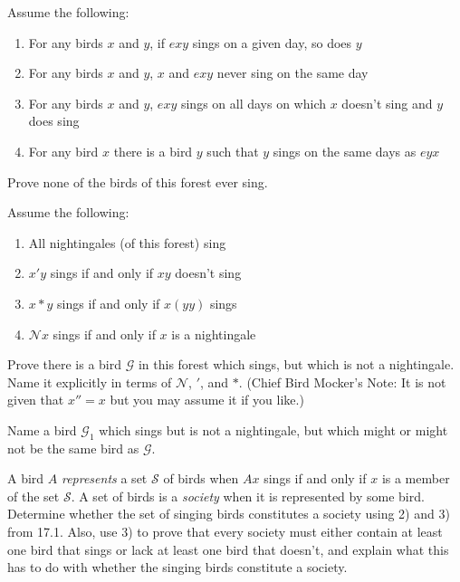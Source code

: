 \documentclass[12pt, letterpaper]{article}
\begin{document}
\begin{prob}{16.1} 
Assume the following:

\begin{enumerate}[label=\textbf{\arabic*)},itemsep=0mm]
  \item For any birds $x$ and $y$, if $exy$ sings on a given day, so does $y$
  \item For any birds $x$ and $y$, $x$ and $exy$ never sing on the same day
  \item For any birds $x$ and $y$, $exy$ sings on all days on which $x$ doesn't sing and $y$ does sing
  \item For any bird $x$ there is a bird $y$ such that $y$ sings on the same days as $eyx$
\end{enumerate}

\noindent Prove none of the birds of this forest ever sing.
\end{prob}

\begin{prob}{17.1}
Assume the following:

\begin{enumerate}[label=\textbf{\arabic*)},itemsep=0mm]
\item All nightingales (of this forest) sing
\item $x'y$ sings if and only if $xy$ doesn't sing
\item $x*y$ sings if and only if $x(yy)$ sings
\item $\mathscr{N}x$ sings if and only if $x$ is a nightingale
\end{enumerate}

Prove there is a bird $\mathscr{G}$ in this forest which sings, but which is not a nightingale. Name it explicitly in terms of $\mathscr{N}$, $'$, and $*$. (Chief Bird Mocker's Note: It is not given that $x'' = x$ but you may assume it if you like.)
\end{prob}

\begin{prob}{17.2} 
Name a bird $\mathscr{G}_1$ which sings but is not a nightingale, but which might or might not be the same bird as $\mathscr{G}$.
\end{prob}

\begin{prob}{17.3} 
A bird $A$ \emph{represents} a set $\mathscr{S}$ of birds when $Ax$ sings if and only if $x$ is a member of the set $\mathscr{S}$. A set of birds is a \emph{society} when it is represented by some bird. Determine whether the set of singing birds constitutes a society using 2) and 3) from 17.1. Also, use 3) to prove that every society must either contain at least one bird that sings or lack at least one bird that doesn't, and explain what this has to do with whether the singing birds constitute a society.
\end{prob}
\end{document}
